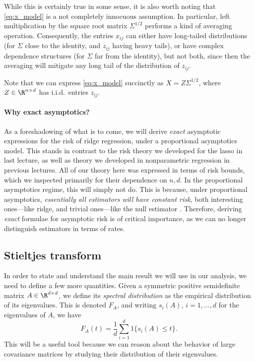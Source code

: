 \documentclass{article}
\begin{document}
While this is certainly true in some sense, it is also worth noting that 
\eqref{eq:x_model} is a not completely innocuous assumption. In particular,
left multiplication by the square root matrix $\Sigma^{1/2}$ performs a kind of
averaging operation. Consequently, the entries $x_{ij}$ can either have
long-tailed distributions (for $\Sigma$ close to the identity, and $z_{ij}$
having heavy tails), or have complex dependence structures (for $\Sigma$ far 
from the identity), but not both, since then the averaging will mitigate any
long tail of the distribution of $z_{ij}$.   

Note that we can express \eqref{eq:x_model} succinctly as $X = Z \Sigma^{1/2}$,
where $Z \in \R^{n \times d}$ has i.i.d.\ entries $z_{ij}$. 

\paragraph{Why exact asymptotics?} 

As a foreshadowing of what is to come, we will derive \emph{exact} asymptotic
expressions for the risk of ridge regression, under a proportional asymptotics 
model. This stands in contrast to the risk theory we developed for the lasso in 
last lecture, as well as theory we developed in nonparametric regression in
previous lectures. All of our theory here was expressed in terms of risk bounds,
which we inspected primarily for their dependence on $n,d$. In the proportional
asymptotics regime, this will simply not do. This is because, under proportional
asymptotics, \emph{essentially all estimators will have constant risk}, both
interesting ones---like ridge, and trivial ones---like the null estimator
. Therefore, deriving \emph{exact} formulae for asymptotic
risk is of critical importance, as we can no longer distinguish estimators in
terms of rates.    

\subsection{Stieltjes transform}

\def\dto{\overset{d}{\to}}
\def\hSigma{\hat\Sigma}

In order to state and understand the main result we will use in our analysis, we
need to define a few more quantities. Given a symmetric positive semidefinite
matrix $A \in \R^{d \times d}$, we define its \emph{spectral distribution} as
the empirical distribution of its eigenvalues. This is denoted $F_A$, and
writing $s_i(A)$, $i=1,\dots,d$ for the eigenvalues of $A$, we have 
\begin{equation}
\label{eq:spectral_dist}
F_A(t) = \frac{1}{d} \sum_{i=1}^d 1\{ s_i(A) \leq t \}. 
\end{equation}
This will be a useful tool because we can reason about the behavior of large
covariance matrices by studying their distribution of their eigenvalues. 
\end{document}
